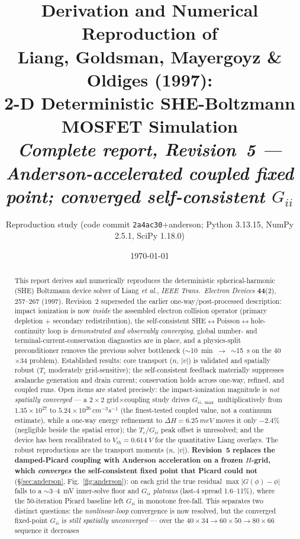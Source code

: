 \documentclass[11pt]{article}
\title{\textbf{Derivation and Numerical Reproduction of\\
Liang, Goldsman, Mayergoyz \& Oldiges (1997):\\
2-D Deterministic SHE-Boltzmann MOSFET Simulation}\\[5pt]
\large\textit{Complete report, Revision~5 --- Anderson-accelerated coupled fixed point; converged self-consistent $G_{ii}$}}
\author{Reproduction study \quad\small(code commit \texttt{2a4ac30}+anderson; Python 3.13.15, NumPy 2.5.1, SciPy 1.18.0)}
\date{\today}
\begin{document}
\maketitle

\begin{abstract}
\noindent
This report derives and numerically reproduces the deterministic spherical-harmonic (SHE)
Boltzmann device solver of Liang \emph{et al.}, \emph{IEEE Trans.\ Electron Devices}
\textbf{44}(2), 257--267 (1997). Revision~2 superseded the earlier one-way/post-processed
description: impact ionization is now \emph{inside} the assembled electron collision operator
(primary depletion + secondary redistribution), the self-consistent
SHE$\leftrightarrow$Poisson$\leftrightarrow$hole-continuity loop is \emph{demonstrated and
observably converging}, global number- and terminal-current-conservation diagnostics are in
place, and a physics-split preconditioner removes the previous solver bottleneck
($\sim$10~min~$\to$~$\sim$15~s on the 40$\times$34 problem). Established results: core
transport ($n$, $|v|$) is validated and spatially robust ($T_e$ moderately grid-sensitive); the
self-consistent feedback materially suppresses avalanche generation and drain current; conservation
holds across one-way, refined, and coupled runs. Open items are stated
precisely: the impact-ionization magnitude is \emph{not spatially converged} --- a
$2\times2$ grid$\times$coupling study drives $G_{ii,\max}$ multiplicatively from
$1.35\times10^{27}$ to $5.24\times10^{26}\,\si{cm^{-3}s^{-1}}$ (the finest-tested coupled value,
not a continuum estimate), while a one-way energy refinement to $\Delta H=\SI{6.25}{meV}$ moves it
only $-2.4\%$ (negligible beside the spatial error); the $T_e$/$G_{ii}$ peak offset is unresolved;
and the device has been recalibrated to $V_{th}=\SI{0.614}{V}$ for the quantitative Liang overlays.
The robust reproductions are the transport moments ($n$, $|v|$). \textbf{Revision~5 replaces the
damped-Picard coupling with Anderson acceleration on a frozen $H$-grid, which \emph{converges} the
self-consistent fixed point that Picard could not} (\S\ref{sec:anderson}, Fig.~\ref{fig:anderson}):
on each grid the true residual $\max|G(\phi){-}\phi|$ falls to a $\sim$3--4~mV inner-solve floor and
$G_{ii}$ \emph{plateaus} (last-4 spread 1.6--11\%), where the 50-iteration Picard baseline left
$G_{ii}$ in monotone free-fall. This separates two distinct questions: the \emph{nonlinear-loop}
convergence is now resolved, but the converged fixed-point $G_{ii}$ is \emph{still spatially
unconverged} --- over the $40{\times}34\!\to\!60{\times}50\!\to\!80{\times}66$ sequence it decreases

\end{abstract}
\end{document}

